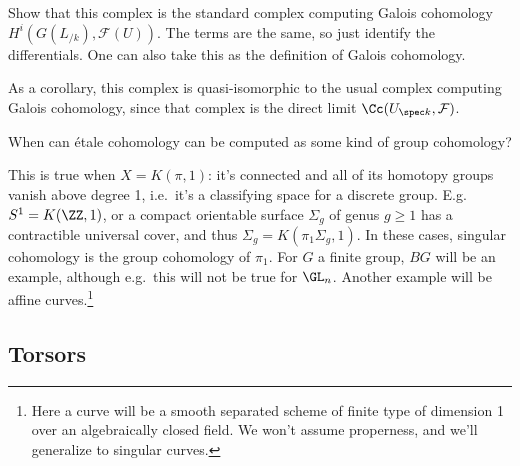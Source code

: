 \begin{example}[?]
\begin{exercise}[?]

Show that this complex is the standard complex computing Galois
cohomology \(H^i( G(L_{/k}), \mathcal{F}(U) )\). The terms are the same,
so just identify the differentials. One can also take this as the
definition of Galois cohomology.

\end{exercise}

As a corollary, this complex is quasi-isomorphic to the usual complex
computing Galois cohomology, since that complex is the direct limit
\(\Cc(U_{\spec k}, \mathcal{F})\).

\end{example}

\begin{question}

When can étale cohomology can be computed as some kind of group
cohomology?

\end{question}

\begin{answer}

This is true when \(X = K(\pi, 1)\): it's connected and all of its
homotopy groups vanish above degree 1, i.e.~it's a classifying space for
a discrete group. E.g. \(S^1 = K(\ZZ, 1)\), or a compact orientable
surface \(\Sigma_g\) of genus \(g\geq 1\) has a contractible universal
cover, and thus \(\Sigma_g = K(\pi_1 \Sigma_g, 1)\). In these cases,
singular cohomology is the group cohomology of \(\pi_1\). For \(G\) a
finite group, \(BG\) will be an example, although e.g.~this will not be
true for \(\GL_n\). Another example will be affine curves.\footnote{Here
  a curve will be a smooth separated scheme of finite type of dimension
  1 over an algebraically closed field. We won't assume properness, and
  we'll generalize to singular curves.}

\end{answer}

\hypertarget{torsors}{%
\subsection{Torsors}\label{torsors}}

